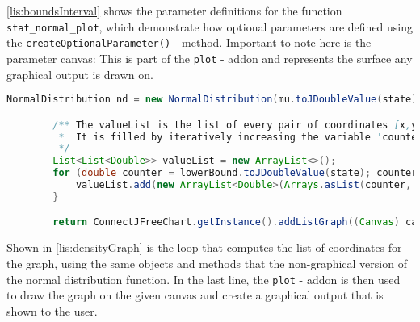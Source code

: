 \ref{lis:boundsInterval} shows the parameter definitions for the function \lstinline{stat_normal_plot}, which demonstrate how optional parameters are defined using the \lstinline{createOptionalParameter()} - method. Important to note here is the parameter canvas: This is part of the \lstinline{plot} - addon and represents the surface any graphical output is drawn on.

\begin{center}
	\begin{lstlisting}[caption={Computation of propability density graph for Normal Distributions}, language={java}, label=lis:densityGraph]
		NormalDistribution nd = new NormalDistribution(mu.toJDoubleValue(state), sigma.toJDoubleValue(state));

        /** The valueList is the list of every pair of coordinates [x,y] that the graph consists of.
         *  It is filled by iteratively increasing the variable 'counter' (x), and calculating the density for every new value of 'counter' (y).
         */
        List<List<Double>> valueList = new ArrayList<>();
        for (double counter = lowerBound.toJDoubleValue(state); counter < upperBound.toJDoubleValue(state); counter += interval.toJDoubleValue(state)) {
            valueList.add(new ArrayList<Double>(Arrays.asList(counter, nd.density(counter))));
        }

        return ConnectJFreeChart.getInstance().addListGraph((Canvas) canvas, valueList, "Probability Density Function (mean: " + mu.toString() + ", standard deviation: " + sigma.toString(), Defaults.DEFAULT_COLOR_SCHEME, false);
	\end{lstlisting}
\end{center}

Shown in \ref{lis:densityGraph} is the loop that computes the list of coordinates for the graph, using the same objects and methods that the non-graphical version of the normal distribution function. In the last line, the \lstinline{plot} - addon is then used to draw the graph on the given canvas and create a graphical output that is shown to the user.